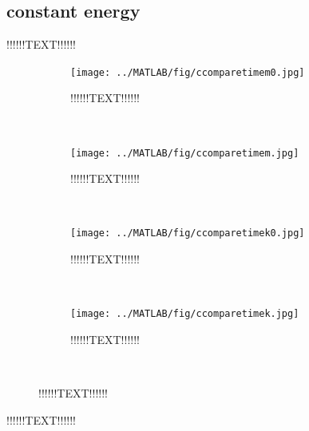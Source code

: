 \subsection{constant energy}%
!!!!!!TEXT!!!!!! 
\begin{figure}[H]
        \centering
        \begin{subfigure}[b]{0.3\textwidth}
                \texttt{[image: ../MATLAB/fig/ccomparetimem0.jpg]}
                \caption{ !!!!!!TEXT!!!!!! }
                \label{fig:ccomparetimem0}
        \end{subfigure}
        ~
        \begin{subfigure}[b]{0.3\textwidth}
                \texttt{[image: ../MATLAB/fig/ccomparetimem.jpg]}
                \caption{ !!!!!!TEXT!!!!!! }
                \label{fig:ccomparetimem}
        \end{subfigure}
        ~

        
        \begin{subfigure}[b]{0.3\textwidth}
                \texttt{[image: ../MATLAB/fig/ccomparetimek0.jpg]}
                \caption{ !!!!!!TEXT!!!!!! }
                \label{fig:ccomparetimek0}
        \end{subfigure}
        ~
        \begin{subfigure}[b]{0.3\textwidth}
                \texttt{[image: ../MATLAB/fig/ccomparetimek.jpg]}
                \caption{ !!!!!!TEXT!!!!!! }
                \label{fig:ccomparetimek}
        \end{subfigure}
        ~

        \caption{ !!!!!!TEXT!!!!!!}
        \label{fig:ccomparetime}
\end{figure}
!!!!!!TEXT!!!!!! \\
